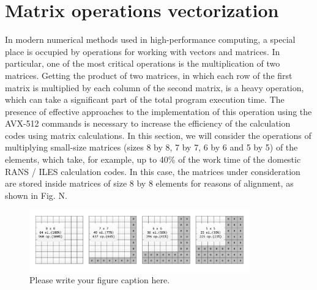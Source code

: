 \documentclass[
11pt,%
tightenlines,%
twoside,%
onecolumn,%
nofloats,%
nobibnotes,%
nofootinbib,%
superscriptaddress,%
noshowpacs,%
centertags]%
{revtex4}
\begin{document}
\section{Matrix operations vectorization}

In modern numerical methods used in high-performance computing, a special place is occupied by operations for working with vectors and matrices. In particular, one of the most critical operations is the multiplication of two matrices. Getting the product of two matrices, in which each row of the first matrix is multiplied by each column of the second matrix, is a heavy operation, which can take a significant part of the total program execution time. The presence of effective approaches to the implementation of this operation using the AVX-512 commands is necessary to increase the efficiency of the calculation codes using matrix calculations. In this section, we will consider the operations of multiplying small-size matrices (sizes 8 by 8, 7 by 7, 6 by 6 and 5 by 5) of the elements, which take, for example, up to 40\% of the work time of the domestic RANS / ILES calculation codes. In this case, the matrices under consideration are stored inside matrices of size 8 by 8 elements for reasons of alignment, as shown in Fig. N.

\begin{figure}[h]
\setcaptionmargin{5mm}
\onelinecaptionstrue  %
\includegraphics[width=0.85\textwidth]{pics/matrices_8x8_7x7_6x6_5x5.pdf}
\caption{Please write your figure caption here.}\label{fig:1}
\end{figure}
\end{document}
